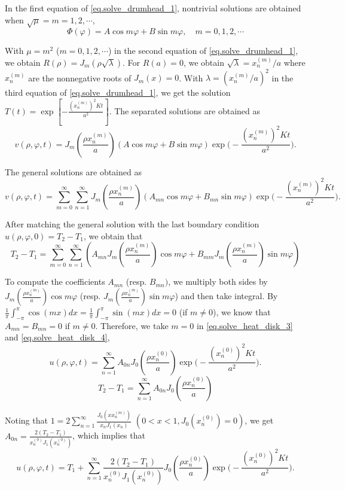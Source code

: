 In the first equation of \eqref{eq.solve_drumhead_1}, nontrivial solutions are obtained when $\sqrt{\mu} = m = 1,2, \cdots$,
$$
\Phi(\varphi)=A \cos m \varphi+B \sin m \varphi, \quad m=0,1,2, \cdots
$$


With $\mu=m^2$ ($m=0,1,2, \cdots$) in the second equation of \eqref{eq.solve_drumhead_1}, we obtain $R(\rho)=J_m(\rho \sqrt{\lambda})$. For $R(a)=0$, we obtain $\sqrt{\lambda}=x_n^{(m)} / a$ where $x_n^{(m)}$ are the nonnegative roots of $J_m(x)=0$. With $\lambda = \left(x_n^{(m)} / a\right)^2$ in the third equation of \eqref{eq.solve_drumhead_1}, we get the solution $T(t) = \exp \left[-\frac{\left(x_n^{(m)}\right)^2 K t}{a^2}\right]$. The separated solutions are obtained as
\begin{equation}\label{eq.solve_heat_disk_2}
    v(\rho, \varphi, t)=J_m\left(\frac{\rho x_n^{(m)}}{a}\right)(A \cos m \varphi+B \sin m \varphi)\exp \Bigg(-\frac{\left(x_n^{(m)}\right)^2 K t}{a^2}\Bigg).
\end{equation}

The general solutions are obtained as
\begin{equation}\label{eq.solve_heat_disk_3}
    v(\rho, \varphi, t)=\sum_{m=0}^{\infty} \sum_{n=1}^{\infty} J_m\left(\frac{\rho x_n^{(m)}}{a}\right)\left(A_{m n} \cos m \varphi+B_{m n} \sin m \varphi\right) \exp \Bigg(-\frac{\left(x_n^{(m)}\right)^2 K t}{a^2}\Bigg).
\end{equation}

After matching the general solution with the last boundary condition $u(\rho, \varphi, 0)=T_2-T_1$, we obtain that 
\begin{equation}\label{eq.solve_heat_disk_4}
    T_2-T_1 = \sum_{m=0}^{\infty} \sum_{n=1}^{\infty}\left(A_{m n} J_m\left(\frac{\rho x_n^{(m)}}{a}\right) \cos m \varphi+B_{m m} J_m\left(\frac{\rho x_n^{(m)}}{a}\right) \sin m \varphi\right)
\end{equation}

To compute the coefficients $A_{m n}$ (resp. $B_{m n})$, we multiply both sides by $J_m\left(\frac{\rho x_n^{(m)}}{a}\right) \cos m \varphi$ (resp. $J_m\left(\frac{\rho x_n^{(m)}}{a}\right) \sin m \varphi$) and then take integral. By $\frac{1}{\pi} \int_{-\pi}^\pi \cos (m x) d x = \frac{1}{\pi} \int_{-\pi}^\pi \sin (m x) d x = 0$ (if $m\neq 0$), we know that $A_{m n} = B_{m n} = 0$ if $m\neq 0$. Therefore, we take $m = 0$ in \eqref{eq.solve_heat_disk_3} and \eqref{eq.solve_heat_disk_4},
$$
u(\rho, \varphi, t)=\sum_{n=1}^{\infty} A_{0 n} J_0\left(\frac{\rho x_n^{(0)}}{a}\right) \exp \Bigg(-\frac{\left(x_n^{(0)}\right)^2 K t}{a^2}\Bigg).
$$
\[
    T_2-T_1 = \sum_{n=1}^{\infty} A_{0 n} J_0\left(\frac{\rho x_n^{(0)}}{a}\right)
\]

Noting that $1=2 \sum_{n=1}^{\infty} \frac{J_0\left(x x_n^{(m)}\right)}{x_n J_1\left(x_n\right)}$ $(0<x<1, J_0\left(x_n^{(0)}\right)=0)$, we get $A_{0n} = \frac{2(T_2-T_1)}{x_n^{(0)} J_1\left(x_n^{(0)}\right)}$, which implies that 
$$
u(\rho, \varphi, t)=T_1+\sum_{n=1}^{\infty} \frac{2(T_2-T_1)}{x_n^{(0)} J_1\left(x_n^{(0)}\right)} J_0\left(\frac{\rho x_n^{(0)}}{a}\right) \exp \Bigg(-\frac{\left(x_n^{(0)}\right)^2 K t}{a^2}\Bigg).
$$